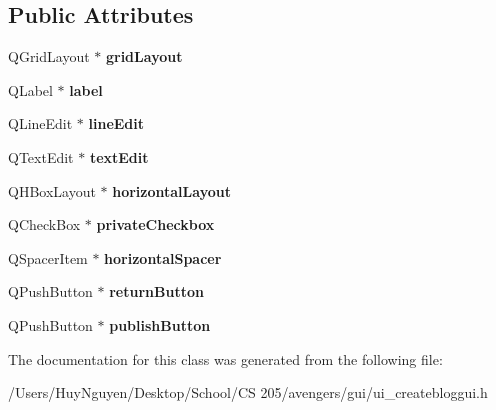 \subsection*{Public Attributes}
\begin{DoxyCompactItemize}
\item 
Q\+Grid\+Layout $\ast$ {\bfseries grid\+Layout}\hypertarget{classUi__CreateBlogGUI_a93b917c93d85c00cb2c119c840425027}{}\label{classUi__CreateBlogGUI_a93b917c93d85c00cb2c119c840425027}

\item 
Q\+Label $\ast$ {\bfseries label}\hypertarget{classUi__CreateBlogGUI_a99f440d09c09a1118d53fc8bc15eb881}{}\label{classUi__CreateBlogGUI_a99f440d09c09a1118d53fc8bc15eb881}

\item 
Q\+Line\+Edit $\ast$ {\bfseries line\+Edit}\hypertarget{classUi__CreateBlogGUI_a560523d7a38d1e87cadd31e86b824e03}{}\label{classUi__CreateBlogGUI_a560523d7a38d1e87cadd31e86b824e03}

\item 
Q\+Text\+Edit $\ast$ {\bfseries text\+Edit}\hypertarget{classUi__CreateBlogGUI_a1875be5481659250285786cceeb43354}{}\label{classUi__CreateBlogGUI_a1875be5481659250285786cceeb43354}

\item 
Q\+H\+Box\+Layout $\ast$ {\bfseries horizontal\+Layout}\hypertarget{classUi__CreateBlogGUI_a9b0b3d448c7a3fe31479e6307547c6a6}{}\label{classUi__CreateBlogGUI_a9b0b3d448c7a3fe31479e6307547c6a6}

\item 
Q\+Check\+Box $\ast$ {\bfseries private\+Checkbox}\hypertarget{classUi__CreateBlogGUI_abe16e68f8918defaba1af6b6ac55d316}{}\label{classUi__CreateBlogGUI_abe16e68f8918defaba1af6b6ac55d316}

\item 
Q\+Spacer\+Item $\ast$ {\bfseries horizontal\+Spacer}\hypertarget{classUi__CreateBlogGUI_a814e0f8712d39c426ac220b8c325c0f9}{}\label{classUi__CreateBlogGUI_a814e0f8712d39c426ac220b8c325c0f9}

\item 
Q\+Push\+Button $\ast$ {\bfseries return\+Button}\hypertarget{classUi__CreateBlogGUI_a92713ab183d059cba6d56d9129337af2}{}\label{classUi__CreateBlogGUI_a92713ab183d059cba6d56d9129337af2}

\item 
Q\+Push\+Button $\ast$ {\bfseries publish\+Button}\hypertarget{classUi__CreateBlogGUI_ada3e6aa8a30807aeaa8a4af199d37590}{}\label{classUi__CreateBlogGUI_ada3e6aa8a30807aeaa8a4af199d37590}

\end{DoxyCompactItemize}


The documentation for this class was generated from the following file\+:\begin{DoxyCompactItemize}
\item 
/\+Users/\+Huy\+Nguyen/\+Desktop/\+School/\+C\+S 205/avengers/gui/ui\+\_\+createbloggui.\+h\end{DoxyCompactItemize}

